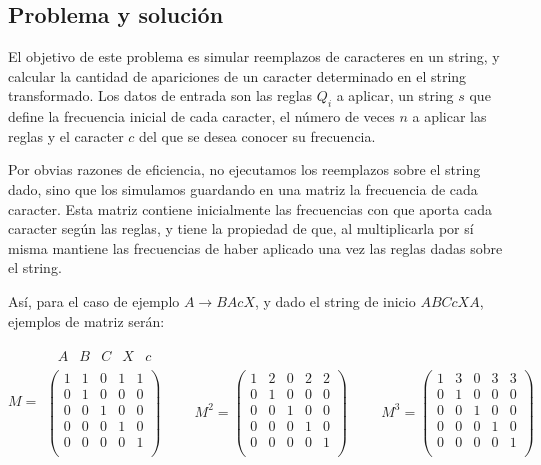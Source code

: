 \subsection*{Problema y solución}

El objetivo de este problema es simular reemplazos de caracteres en un
string, y calcular la cantidad de apariciones de un caracter determinado
en el string transformado. Los datos de entrada son las reglas $Q_i$ a aplicar,
un string $s$ que define la frecuencia inicial de cada caracter, el número de
veces $n$ a aplicar las reglas y el caracter $c$ del que se desea conocer su
frecuencia.

Por obvias razones de eficiencia, no ejecutamos los reemplazos sobre el
string dado, sino que los simulamos guardando en una matriz la frecuencia
de cada caracter. Esta matriz contiene inicialmente las frecuencias con
que aporta cada caracter según las reglas, y tiene la propiedad de que,
al multiplicarla por sí misma mantiene las frecuencias de haber aplicado
una vez las reglas dadas sobre el string.

Así, para el caso de ejemplo $A \rightarrow BAcX$, y dado el string de inicio
$ABCcXA$, ejemplos de matriz serán:

$$M =
\begin{array}{l}
\begin{matrix}
	\ \ A & B & C & X & c
\end{matrix} \\
\left(
	\begin{array}{ccccc}
	1 & 1 & 0 & 1 & 1 \\
	0 & 1 & 0 & 0 & 0 \\
	0 & 0 & 1 & 0 & 0 \\
	0 & 0 & 0 & 1 & 0 \\
	0 & 0 & 0 & 0 & 1 \\
	\end{array}
\right)
\hspace{1cm}
M^2 = \left(
\begin{array}{ccccc}
1 & 2 & 0 & 2 & 2 \\
0 & 1 & 0 & 0 & 0 \\
0 & 0 & 1 & 0 & 0 \\
0 & 0 & 0 & 1 & 0 \\
0 & 0 & 0 & 0 & 1 \\
\end{array}
\right)
\hspace{1cm}
M^3 = \left(
\begin{array}{ccccc}
1 & 3 & 0 & 3 & 3 \\
0 & 1 & 0 & 0 & 0 \\
0 & 0 & 1 & 0 & 0 \\
0 & 0 & 0 & 1 & 0 \\
0 & 0 & 0 & 0 & 1 \\
\end{array}
\right)
\end{array}
$$

